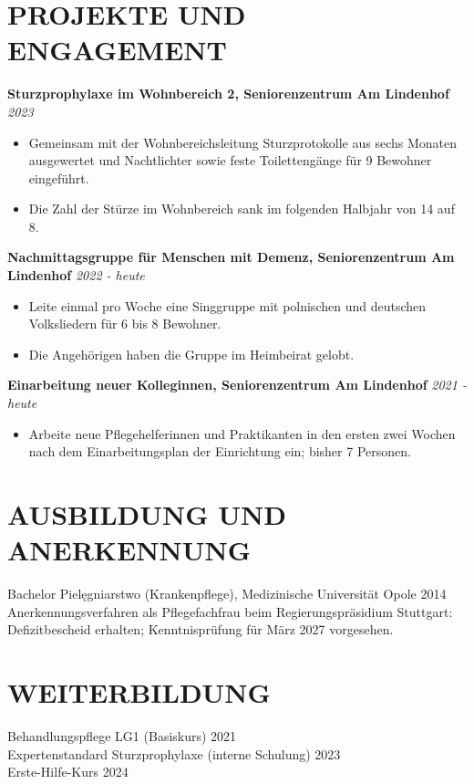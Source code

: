 \documentclass[11pt,a4paper]{article}
\begin{document}
\section*{PROJEKTE UND ENGAGEMENT}
\textbf{Sturzprophylaxe im Wohnbereich 2, Seniorenzentrum Am Lindenhof} \hfill \textit{2023}
\begin{itemize}
\item Gemeinsam mit der Wohnbereichsleitung Sturzprotokolle aus sechs Monaten ausgewertet und Nachtlichter sowie feste Toilettengänge für 9 Bewohner eingeführt.
\item Die Zahl der Stürze im Wohnbereich sank im folgenden Halbjahr von 14 auf 8.
\end{itemize}

\textbf{Nachmittagsgruppe für Menschen mit Demenz, Seniorenzentrum Am Lindenhof} \hfill \textit{2022 - heute}
\begin{itemize}
\item Leite einmal pro Woche eine Singgruppe mit polnischen und deutschen Volksliedern für 6 bis 8 Bewohner.
\item Die Angehörigen haben die Gruppe im Heimbeirat gelobt.
\end{itemize}

\textbf{Einarbeitung neuer Kolleginnen, Seniorenzentrum Am Lindenhof} \hfill \textit{2021 - heute}
\begin{itemize}
\item Arbeite neue Pflegehelferinnen und Praktikanten in den ersten zwei Wochen nach dem Einarbeitungsplan der Einrichtung ein; bisher 7 Personen.
\end{itemize}

\section*{AUSBILDUNG UND ANERKENNUNG}
Bachelor Pielęgniarstwo (Krankenpflege), Medizinische Universität Opole \hfill 2014\\
Anerkennungsverfahren als Pflegefachfrau beim Regierungspräsidium Stuttgart: Defizitbescheid erhalten; Kenntnisprüfung für März 2027 vorgesehen.

\section*{WEITERBILDUNG}
Behandlungspflege LG1 (Basiskurs) \hfill 2021\\
Expertenstandard Sturzprophylaxe (interne Schulung) \hfill 2023\\
Erste-Hilfe-Kurs \hfill 2024
\end{document}

